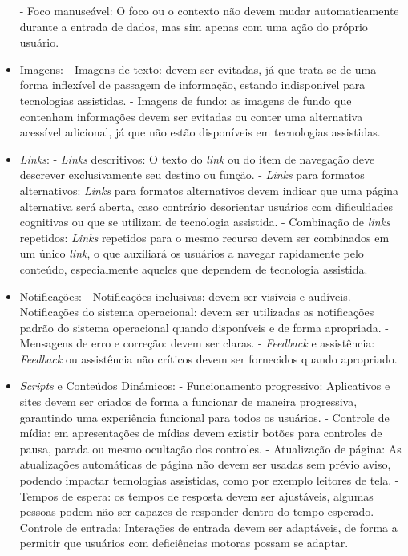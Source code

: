 \begin{itemize}
		\subitem - Foco manuseável: O foco ou o contexto não devem mudar automaticamente durante a entrada de dados, mas sim apenas com uma ação do próprio usuário.
	\item Imagens:
		\subitem - Imagens de texto: devem ser evitadas, já que trata-se de uma forma inflexível de passagem de informação, estando indisponível para tecnologias assistidas.
		\subitem - Imagens de fundo: as imagens de fundo que contenham informações devem ser evitadas ou conter uma alternativa acessível adicional, já que não estão disponíveis em tecnologias assistidas.
	\item \textit{Links}:
		\subitem - \textit{Links} descritivos: O texto do \textit{link} ou do item de navegação deve descrever exclusivamente seu destino ou função.
		\subitem - \textit{Links} para formatos alternativos: \textit{Links} para formatos alternativos devem indicar
		que uma página alternativa será aberta, caso contrário desorientar usuários com dificuldades cognitivas ou que se utilizam de tecnologia assistida.
		\subitem - Combinação de \textit{links} repetidos: \textit{Links} repetidos para o mesmo recurso devem ser combinados em um único \textit{link}, o que auxiliará os usuários a navegar rapidamente pelo conteúdo, especialmente aqueles que dependem de tecnologia assistida.
	\item Notificações:
		\subitem - Notificações inclusivas: devem ser visíveis e audíveis.
		\subitem - Notificações do sistema operacional: devem ser utilizadas as notificações padrão do sistema operacional quando disponíveis e de forma apropriada.
		\subitem - Mensagens de erro e correção: devem ser claras.
		\subitem - \textit{Feedback} e assistência: \textit{Feedback} ou assistência não críticos devem ser fornecidos quando apropriado.
	\item \textit{Scripts} e Conteúdos Dinâmicos:
		\subitem - Funcionamento progressivo: Aplicativos e sites devem ser criados de forma a funcionar de maneira progressiva, garantindo uma experiência funcional para todos os usuários.
		\subitem - Controle de mídia: em apresentações de mídias devem existir botões para controles de pausa, parada ou mesmo ocultação dos controles.
		\subitem - Atualização de página: As atualizações automáticas de página não devem ser usadas sem prévio aviso, podendo impactar tecnologias assistidas, como por exemplo leitores de tela.
		\subitem - Tempos de espera: os tempos de resposta devem ser ajustáveis, algumas pessoas podem não ser capazes de responder dentro do tempo esperado.
		\subitem - Controle de entrada: Interações de entrada devem ser adaptáveis, de forma a permitir que usuários com deficiências motoras possam se adaptar.

\end{itemize}
